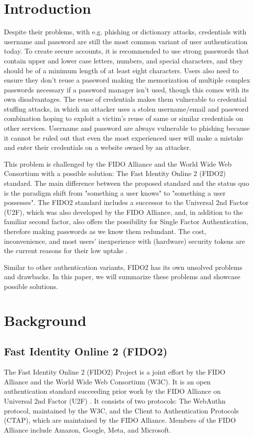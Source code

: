 \documentclass[runningheads]{llncs}
\begin{document}
\section{Introduction}
Despite their problems, with e.g. phishing or dictionary attacks, credentials with username and password are still the most common variant of user authentication today. To create secure accounts, it is recommended to use strong passwords that contain upper and lower case letters, numbers, and special characters, and they should be of a minimum length of at least eight characters. Users also need to ensure they don't reuse a password making the memorization of multiple complex passwords necessary if a password manager isn't used, though this comes with its own disadvantages. The reuse of credentials makes them vulnerable to credential stuffing attacks, in which an attacker uses a stolen username/email and password combination hoping to exploit a victim's reuse of same or similar credentials on other services. Username and password are always vulnerable to phishing because it cannot be ruled out that even the most experienced user will make a mistake and enter their credentials on a website owned by an attacker.

This problem is challenged by the FIDO Alliance and the World Wide Web Consortium with a possible solution: The Fast Identity Online 2 (FIDO2) standard. The main difference between the proposed standard and the status quo is the paradigm shift from "something a user knows" to "something a user possesses". The FIDO2 standard includes a successor to the Universal 2nd Factor (U2F), which was also developed by the FIDO Alliance, and, in addition to the familiar second factor, also offers the possibility for Single Factor Authentication, therefore making passwords as we know them redundant. The cost, inconvenience, and most users' inexperience with (hardware) security tokens are the current reasons for their low uptake \cite{274547}\cite{9152694}.

Similar to other authentication variants, FIDO2 has its own unsolved problems and drawbacks. In this paper, we will summarize these problems and showcase possible solutions. 

\section{Background}
\subsection{Fast Identity Online 2 (FIDO2)}
The Fast Identity Online 2 (FIDO2) Project is a joint effort by the FIDO Alliance and the World Wide Web Consortium (W3C). It is an open authentication standard succeeding prior work by the FIDO Alliance on Universal 2nd Factor (U2F) \cite{9152694}. It consists of two protocols: The WebAuthn protocol, maintained by the W3C, and the Client to Authentication Protocols (CTAP), which are maintained by the FIDO Alliance. Members of the FIDO Alliance include Amazon, Google, Meta, and Microsoft.
\end{document}
